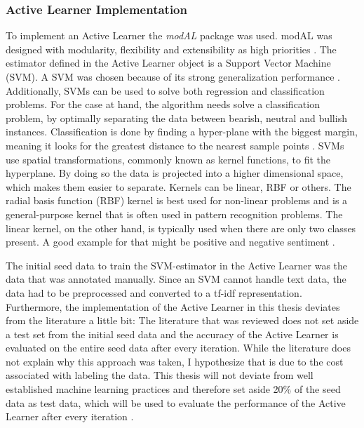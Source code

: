 \documentclass[11pt, a4paper]{article}
\begin{document}
\subsubsection{Active Learner Implementation}
To implement an Active Learner the \emph{modAL} package was used. modAL was designed with modularity, flexibility and extensibility as high priorities \citep{danka2018modal}. 
The estimator defined in the Active Learner object is a Support Vector Machine (SVM). A SVM was chosen because of its strong generalization 
performance \citep{alves2014comparisonsvm}.
Additionally, SVMs can be used to solve both regression and 
classification problems. For the case at hand, the algorithm needs solve a classification problem, by optimally separating the data between bearish, 
neutral and bullish instances. Classification is done by finding a hyper-plane with the biggest margin, meaning it looks for the greatest distance 
to the nearest sample points \citep{jemai2021SentimentAnalysis}. SVMs use spatial transformations, commonly known as kernel functions, to fit the hyperplane.
By doing so the data is projected into a higher dimensional space, which makes them easier to separate.
Kernels can be linear, RBF or others. The radial basis function (RBF) kernel is best used for non-linear problems and is a general-purpose kernel that 
is often used in pattern recognition problems. The linear kernel, on the other hand, is typically used when there are only two classes present. 
A good example for that might be positive and negative sentiment \citep{alves2014comparisonsvm}.

The initial seed data to train the SVM-estimator in the Active Learner was the data that was annotated manually.
Since an SVM cannot handle text data, the data had to be preprocessed and converted to a tf-idf representation. %
Furthermore, the implementation of the Active Learner in this thesis deviates from the literature a little bit: The literature that was reviewed
does not set aside a test set from the initial seed data and the accuracy of the Active Learner is evaluated on the entire seed data after every iteration. 
While the literature does not explain why this approach was
taken, I hypothesize that is due to the cost associated with labeling the data. This thesis will not deviate from well established machine learning practices
and therefore set aside 20\% of the seed data as test data, which will be used to evaluate the performance of the Active Learner after every iteration \cite[p. 196]{raschka2019pythonmachinelearning}.
\end{document}
